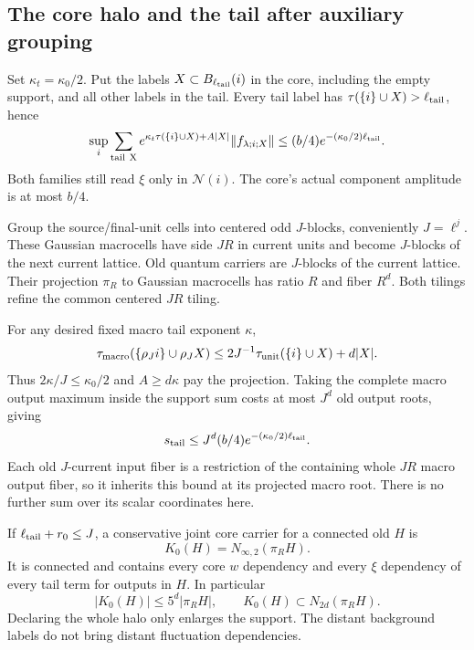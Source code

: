 \documentclass[11pt]{article}
\theoremstyle{remark}
\begin{document}
\subsection{The core halo and the tail after auxiliary grouping}
\label{cdj-grouping-section}

Set $\kappa_t=\kappa_0/2$. Put the labels
$X\subset B_{\ell_{\rm tail}}(i)$ in the core, including
the empty support, and all other labels in the tail.
Every tail label has
$\tau(\{i\}\cup X)>\ell_{\rm tail}$, hence
\begin{equation}\label{cdj-unit-tail}
 \sup_i\sum_{\rm tail\ X}
 e^{\kappa_t\tau(\{i\}\cup X)+A|X|}
                  \|f_{\lambda;i;X}\|
 \le(b/4)e^{-(\kappa_0/2)\ell_{\rm tail}}.
\end{equation}
Both families still read $\xi$ only in $\mathcal N(i)$.
The core's actual component amplitude is at most $b/4$.

Group the source/final-unit cells into centered odd $J$-blocks,
conveniently $J=\ell^j$. These Gaussian macrocells have
side $JR$ in current units and become $J$-blocks of the next
current lattice. Old quantum carriers are $J$-blocks of
the current lattice. Their projection $\pi_R$ to Gaussian
macrocells has ratio $R$ and fiber $R^d$.
Both tilings refine the common centered $JR$ tiling.

For any desired fixed macro tail exponent $\kappa$,
\[
 \tau_{\rm macro}(\{\rho_J i\}\cup\rho_JX)
 \le2J^{-1}\tau_{\rm unit}(\{i\}\cup X)+d|X|.
\]
Thus $2\kappa/J\le\kappa_0/2$ and $A\ge d\kappa$
pay the projection. Taking the complete macro output
maximum inside the support sum costs at most $J^d$
old output roots, giving
\begin{equation}\label{cdj-macro-tail}
 s_{\rm tail}\le J^d(b/4)e^{-(\kappa_0/2)\ell_{\rm tail}}.
\end{equation}
Each old $J$-current input fiber is a restriction of
the containing whole $JR$ macro output fiber, so it
inherits this bound at its projected macro root.
There is no further sum over its scalar coordinates here.

If $\ell_{\rm tail}+r_0\le J$, a conservative joint core
carrier for a connected old $H$ is
\begin{equation}\label{cdj-actual-core}
 K_0(H)=N_{\infty,2}(\pi_RH).
\end{equation}
It is connected and contains every core $w$ dependency
and every $\xi$ dependency of every tail term for outputs
in $H$. In particular
\[
 |K_0(H)|\le5^d|\pi_RH|,\qquad
 K_0(H)\subset N_{2d}(\pi_RH).
\]
Declaring the whole halo only enlarges the support.
The distant background labels do not bring distant
fluctuation dependencies.
\end{document}
